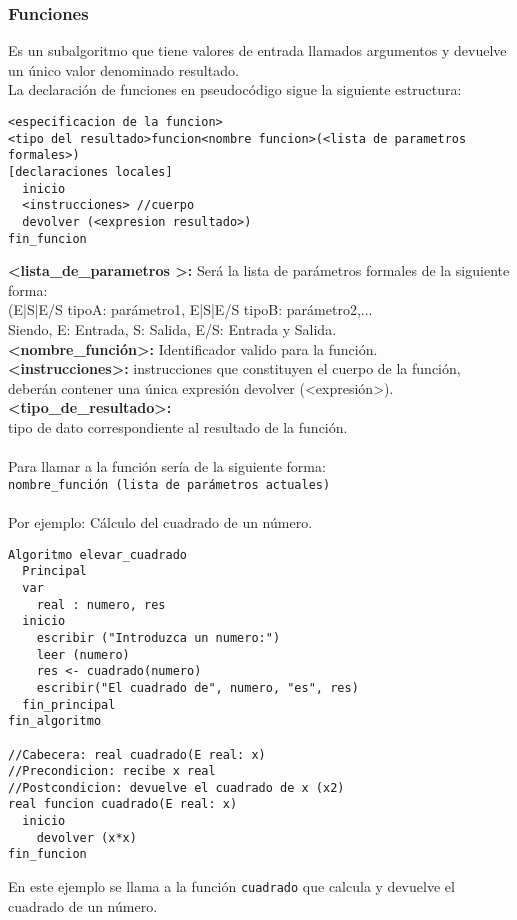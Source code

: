 \documentclass[12pt,letterpaper]{article}
\begin{document}
\subsubsection{Funciones}

Es un subalgoritmo que tiene valores de entrada llamados argumentos y devuelve un único valor denominado resultado.\\
La declaración de funciones en pseudocódigo sigue la siguiente estructura:
\newpage
\begin{lstlisting}
<especificacion de la funcion>
<tipo del resultado>funcion<nombre funcion>(<lista de parametros formales>)
[declaraciones locales]
  inicio
  <instrucciones> //cuerpo
  devolver (<expresion resultado>)
fin_funcion
\end{lstlisting}
\textbf{<lista\_de\_parametros >:} Será la lista de parámetros formales de la siguiente forma:\\
	({E|S|E/S} tipoA: parámetro1, {E|S|E/S} tipoB: parámetro2,...\\
	Siendo, E: Entrada, S: Salida, E/S: Entrada y Salida.\\
\textbf{<nombre\_función>:} Identificador valido para la función.\\
\textbf{<instrucciones>:} instrucciones que constituyen el cuerpo de la función, deberán contener una única expresión devolver (<expresión>).\\
\textbf{<tipo\_de\_resultado>:}\\
	tipo de dato correspondiente al resultado de la función.\\\\
Para llamar a la función sería de la siguiente forma:\\
\texttt{nombre\_función (lista de parámetros actuales)}\\\\
Por ejemplo: Cálculo del cuadrado de un número.
\begin{lstlisting}
Algoritmo elevar_cuadrado
  Principal
  var
    real : numero, res
  inicio
    escribir ("Introduzca un numero:")
    leer (numero)
    res <- cuadrado(numero)
    escribir("El cuadrado de", numero, "es", res)
  fin_principal
fin_algoritmo
	
//Cabecera: real cuadrado(E real: x)
//Precondicion: recibe x real
//Postcondicion: devuelve el cuadrado de x (x2)
real funcion cuadrado(E real: x)
  inicio
    devolver (x*x)
fin_funcion
\end{lstlisting}
En este ejemplo se llama a la función \texttt{cuadrado} que calcula y devuelve el cuadrado de un número.
\end{document}
